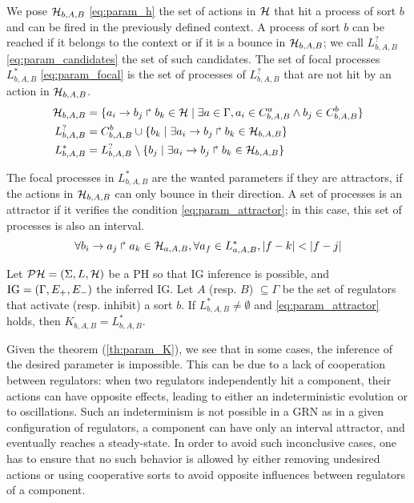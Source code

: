 We pose $\mathcal{H}_{b,A,B}$ \eqref{eq:param_h} the set of actions in $\mathcal{H}$ that hit a process of sort $b$ and can be fired in the previously defined context. A process of sort $b$ can be reached if it belongs to the context or if it is a bounce in $\mathcal{H}_{b,A,B}$; we call $L_{b,A,B}^?$ \eqref{eq:param_candidates} the set of such candidates. The set of focal processes $L_{b,A,B}^*$ \eqref{eq:param_focal} is the set of processes of $L_{b,A,B}^?$ that are not hit by an action in $\mathcal{H}_{b,A,B}$.
\begin{align}
\label{eq:param_h}
  \mathcal{H}_{b,A,B} & = \{ a_i\rightarrow b_j\Rsh b_k \in \mathcal{H} \mid \exists a \in \Gamma, a_i \in C_{b,A,B}^a \wedge b_j \in C_{b,A,B}^b\}
\\
\label{eq:param_candidates}
  L_{b,A,B}^? & =  C_{b,A,B}^b \cup \{ b_k\mid \exists a_i\rightarrow b_j\Rsh b_k \in \mathcal{H}_{b,A,B}\}
\\
\label{eq:param_focal}
  L_{b,A,B}^* & =  L_{b,A,B}^? \setminus \{ b_j \mid \exists a_i\rightarrow b_j\Rsh b_k \in \mathcal{H}_{b,A,B} \}
\end{align}

The focal processes in $L_{b,A,B}^*$ are the wanted parameters if they are attractors, \ie if the actions in $\mathcal{H}_{b,A,B}$ can only bounce in their direction. A set of processes is an attractor if it verifies the condition \eqref{eq:param_attractor}; in this case, this set of processes is also an interval.
\begin{align}
\label{eq:param_attractor}
  \forall b_i\rightarrow a_j\Rsh a_k \in \mathcal{H}_{a,A,B}, \forall a_f \in L_{a,A,B}^*, |f-k| < |f-j|
\end{align}

\begin{theorem}
\label{th:param_K}
Let $\mathcal{PH} = (\Sigma, L, \mathcal{H})$ be a PH so that IG inference is possible, and $\mathrm{IG} = (\Gamma, E_+, E_-)$ the inferred IG.
Let $A$ (resp. $B$) $\subseteq \Gamma$ be the set of regulators that activate (resp. inhibit) a sort $b$.
If $L_{b,A,B}^* \neq \emptyset$ and \eqref{eq:param_attractor} holds, then $K_{b,A,B} = L_{b,A,B}^*$.
\end{theorem}


Given the theorem (\ref{th:param_K}), we see that in some cases, the inference of the desired parameter is impossible. This can be due to a lack of cooperation between regulators: when two regulators independently hit a component, their actions can have opposite effects, leading to either an indeterministic evolution or to oscillations. Such an indeterminism is not possible in a GRN as in a given configuration of regulators, a component can have only an interval attractor, and eventually reaches a steady-state. In order to avoid such inconclusive cases, one has to ensure that no such behavior is allowed by either removing undesired actions or using cooperative sorts to avoid opposite influences between regulators of a component.

